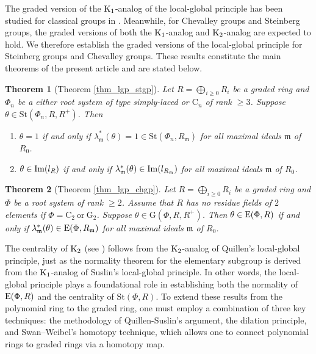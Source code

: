\documentclass[11pt]{amsart}
\newtheorem{thm}{Theorem}[section]
\theoremstyle{definition}
\numberwithin{equation}{section}
\numberwithin{equation}{section}
\newcommand{\C}{\mathrm{C}}
\newcommand{\G}{\mathrm{G}}
\newcommand{\Img}{{\rm Im}}
\newcommand{\<}{\langle}
\renewcommand{\>}{\rangle}
\newcommand{\El}{{\operatorname{\rm E}}}
\newcommand{\K}{{\operatorname{\rm K}}}
\newcommand{\St}{\mathrm{St}}
\begin{document}
The graded version of the $\K_{1}$-analog of the local-global principle has been studied for classical groups in \cite{BaSi20,Gu92}. Meanwhile, for Chevalley groups and Steinberg groups, the graded versions of both the $\K_{1}$-analog and $\K_{2}$-analog are expected to hold. We therefore establish the graded versions of the local-global principle for Steinberg groups and Chevalley groups. These results constitute the main theorems of the present article and are stated below.
\begin{thm}[Theorem \ref{thm_lgp_stgp}]\label{intro_thm_lgp_stgp}
    Let $R=\bigoplus_{i\geq 0}R_{i}$ be a graded ring and $\Phi_{n}$ be a either root system of type simply-laced or $\C_{n}$ of rank $\geq 3$. Suppose $\theta\in \St(\Phi_{n},R, R^{+})$. Then \begin{enumerate}
        \item $\theta=1$ if and only if $\lambda^{\ast}_{\mathfrak{m}}(\theta)=1\in \St(\Phi_{n},R_{\mathfrak{m}})$ for all maximal ideals $\mathfrak{m}$ of $R_{0}$.
        \item $\theta\in\Img(l_{R})$ if and only if $\lambda^{\ast}_{\mathfrak{m}}(\theta)\in \Img(l_{R_{\mathfrak{m}}})$ for all maximal ideals $\mathfrak{m}$ of $R_{0}$.
    \end{enumerate}
\end{thm}
\begin{thm}[Theorem \ref{thm_lgp_chgp}]\label{intro_thm_lgp_chgp}
     Let $R=\bigoplus_{i\geq 0}R_{i}$ be a graded ring and $\Phi$ be a root system of rank $\geq 2$. Assume that $R$ has no residue fields of $2$ elements if $\Phi=\C_{2}~\text{or}~\G_{2}$. Suppose $\theta\in \G(\Phi,R,R^{+})$. Then $\theta\in \El(\Phi,R)$ if and only if $\lambda^{\ast}_{\mathfrak{m}}(\theta)\in \El(\Phi,R_{\mathfrak{m}})$ for all maximal ideals $\mathfrak{m}$ of $R_{0}$.
\end{thm}
The centrality of $\K_{2}$ (see \cite{LaSi17}) follows from the $\K_{2}$-analog of Quillen’s local-global principle, just as the normality theorem for the elementary subgroup is derived from the $\K_{1}$-analog of Suslin's local-global principle. In other words, the local-global principle plays a foundational role in establishing both the normality of $\El(\Phi,R)$ and the centrality of $\St(\Phi,R)$. To extend these results from the polynomial ring to the graded ring,  one must employ a combination of three key techniques: the methodology of Quillen-Suslin’s argument, the dilation principle, and Swan--Weibel’s homotopy technique, which allows one to connect polynomial rings to graded rings via a homotopy map.
\end{document}
